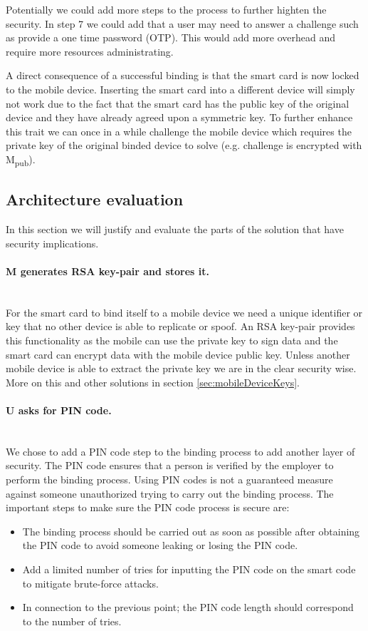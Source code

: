 Potentially we could add more steps to the process to further highten the security. In step 7 we could add that a user may need to answer a challenge such as provide a one time password (OTP). This would add more overhead and require more resources administrating.

A direct consequence of a successful binding is that the smart card is now locked to the mobile device. Inserting the smart card into a different device will simply not work due to the fact that the smart card has the public key of the original device and they have already agreed upon a symmetric key. To further enhance this trait we can once in a while challenge the mobile device which requires the private key of the original binded device to solve (e.g. challenge is encrypted with M\textsubscript{pub}).

\subsection{Architecture evaluation}
In this section we will justify and evaluate the parts of the solution that have security implications.

\paragraph{M generates RSA key-pair and stores it.}\mbox{}\\
For the smart card to bind itself to a mobile device we need a unique identifier or key that no other device is able to replicate or spoof. An RSA key-pair provides this functionality as the mobile can use the private key to sign data and the smart card can encrypt data with the mobile device public key. Unless another mobile device is able to extract the private key we are in the clear security wise. More on this and other solutions in section \ref{sec:mobileDeviceKeys}.

\paragraph{U asks for PIN code.}\mbox{}\\
We chose to add a PIN code step to the binding process to add another layer of security. The PIN code ensures that a person is verified by the employer to perform the binding process. Using PIN codes is not a guaranteed measure against someone unauthorized trying to carry out the binding process. The important steps to make sure the PIN code process is secure are:
\begin{itemize}
  \item The binding process should be carried out as soon as possible after obtaining the PIN code to avoid someone leaking or losing the PIN code.
  \item Add a limited number of tries for inputting the PIN code on the smart code to mitigate brute-force attacks.
  \item In connection to the previous point; the PIN code length should correspond to the number of tries.
\end{itemize}

